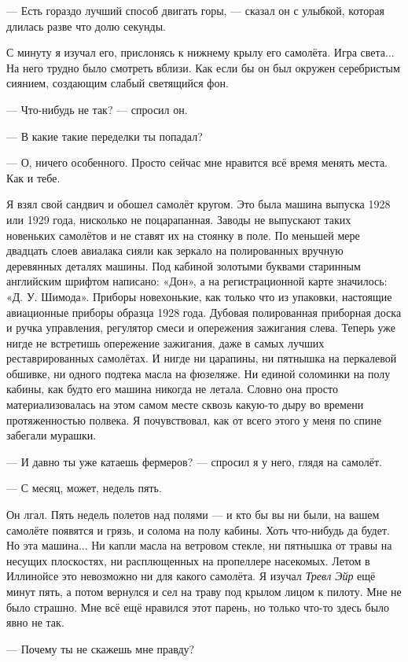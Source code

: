--- Есть гораздо лучший способ двигать горы, --- сказал он с улыбкой, которая длилась разве что долю секунды.

С минуту я изучал его, прислонясь к нижнему крылу его самолёта. Игра света... На него трудно было смотреть вблизи. Как если бы он был окружен серебристым сиянием, создающим слабый светящийся фон.

--- Что-нибудь не так? --- спросил он.

--- В какие такие переделки ты попадал?

--- О, ничего особенного. Просто сейчас мне нравится всё время менять места. Как и тебе.

Я взял свой сандвич и обошел самолёт кругом. Это была машина выпуска 1928 или 1929 года, нисколько не поцарапанная. Заводы не выпускают таких новеньких самолётов и не ставят их на стоянку в поле. По меньшей мере двадцать слоев авиалака сияли как зеркало на полированных вручную деревянных деталях машины. Под кабиной золотыми буквами старинным английским шрифтом написано: «Дон», а на регистрационной карте значилось: «Д. У. Шимода». Приборы новехонькие, как только что из упаковки, настоящие авиационные приборы образца 1928 года. Дубовая полированная приборная доска и ручка управления, регулятор смеси и опережения зажигания слева. Теперь уже нигде не встретишь опережение зажигания, даже в самых лучших реставрированных самолётах. И нигде ни царапины, ни пятнышка на перкалевой обшивке, ни одного подтека масла на фюзеляже. Ни единой соломинки на полу кабины, как будто его машина никогда не летала. Словно она просто материализовалась на этом самом месте сквозь какую-то дыру во времени протяженностью полвека. Я почувствовал, как от всего этого у меня по спине забегали мурашки.

--- И давно ты уже катаешь фермеров? --- спросил я у него, глядя на самолёт.

--- С месяц, может, недель пять.

Он лгал. Пять недель полетов над полями --- и кто бы вы ни были, на вашем самолёте появятся и
грязь, и солома на полу кабины. Хоть что-нибудь да будет. Но эта машина... Ни капли масла на
ветровом стекле, ни пятнышка от травы на несущих плоскостях, ни расплющенных на пропеллере
насекомых. Летом в Иллинойсе это невозможно ни для какого самолёта. Я изучал {\it Тревл Эйр\/} ещё
минут пять, а потом вернулся и сел на траву под крылом лицом к пилоту. Мне не было страшно. Мне
всё ещё нравился этот парень, но только что-то здесь было явно не так.

--- Почему ты не скажешь мне правду?

